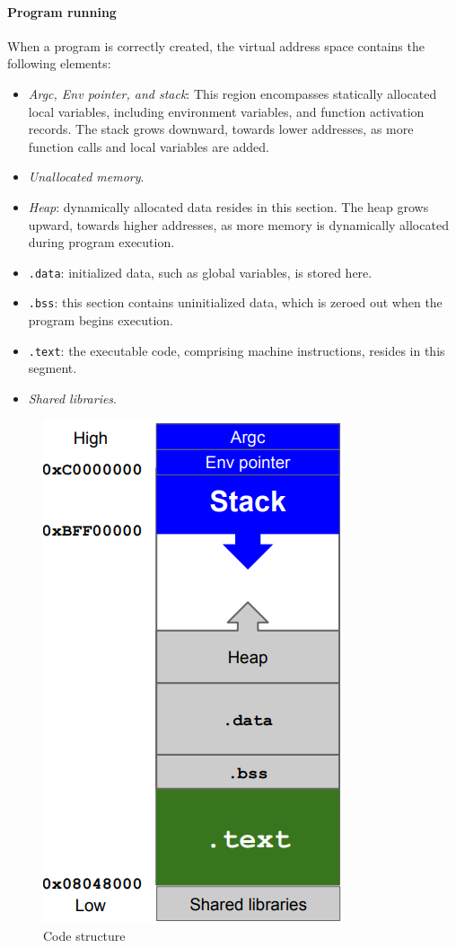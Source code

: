 \paragraph*{Program running}
When a program is correctly created, the virtual address space contains the following elements:
\begin{itemize}
    \item \textit{Argc, Env pointer, and stack}: This region encompasses statically allocated local variables, including environment variables, and function activation records. 
        The stack grows downward, towards lower addresses, as more function calls and local variables are added.
    \item \textit{Unallocated memory}.
    \item \textit{Heap}: dynamically allocated data resides in this section. 
        The heap grows upward, towards higher addresses, as more memory is dynamically allocated during program execution.
    \item \texttt{.data}: initialized data, such as global variables, is stored here.
    \item \texttt{.bss}: this section contains uninitialized data, which is zeroed out when the program begins execution.
    \item \texttt{.text}: the executable code, comprising machine instructions, resides in this segment.
    \item \textit{Shared libraries}. 
\end{itemize}
\begin{figure}[H]
    \centering
    \includegraphics[width=0.5\linewidth]{images/stack.png}
    \caption{Code structure}
\end{figure}

